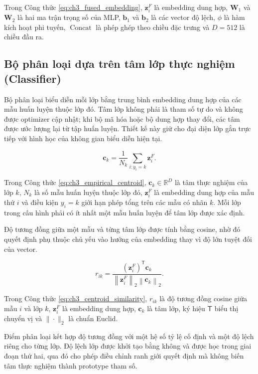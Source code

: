 Trong Công thức \ref{eq:ch3_fused_embedding}, $\boldsymbol{z}_{i}^{F}$ là embedding dung hợp, $\boldsymbol{W}_{1}$ và $\boldsymbol{W}_{2}$ là hai ma trận trọng số của MLP, $\boldsymbol{b}_{1}$ và $\boldsymbol{b}_{2}$ là các vector độ lệch, $\phi$ là hàm kích hoạt phi tuyến, $\operatorname{Concat}$ là phép ghép theo chiều đặc trưng và $D=512$ là chiều đầu ra.

\subsection{Bộ phân loại dựa trên tâm lớp thực nghiệm (Classifier)}

Bộ phân loại biểu diễn mỗi lớp bằng trung bình embedding dung hợp của các mẫu huấn luyện thuộc lớp đó. Tâm lớp không phải là tham số tự do và không được optimizer cập nhật; khi bộ mã hóa hoặc bộ dung hợp thay đổi, các tâm được ước lượng lại từ tập huấn luyện. Thiết kế này giữ cho đại diện lớp gắn trực tiếp với hình học của không gian biểu diễn hiện tại.

\begin{equation}\boldsymbol{c}_{k}=\frac{1}{N_{k}}\sum_{i:y_i=k}\boldsymbol{z}_{i}^{F}.\label{eq:ch3_empirical_centroid}\end{equation}

Trong Công thức \ref{eq:ch3_empirical_centroid}, $\boldsymbol{c}_{k}\in\mathbb{R}^{D}$ là tâm thực nghiệm của lớp $k$, $N_k$ là số mẫu huấn luyện thuộc lớp đó, $\boldsymbol{z}_{i}^{F}$ là embedding dung hợp của mẫu thứ $i$ và điều kiện $y_i=k$ giới hạn phép tổng trên các mẫu có nhãn $k$. Mỗi lớp trong cấu hình phải có ít nhất một mẫu huấn luyện để tâm lớp được xác định.

Độ tương đồng giữa một mẫu và từng tâm lớp được tính bằng cosine, nhờ đó quyết định phụ thuộc chủ yếu vào hướng của embedding thay vì độ lớn tuyệt đối của vector.

\begin{equation}r_{ik}=\frac{\left(\boldsymbol{z}_{i}^{F}\right)^{\mathsf{T}}\boldsymbol{c}_{k}}{\left\|\boldsymbol{z}_{i}^{F}\right\|_{2}\left\|\boldsymbol{c}_{k}\right\|_{2}}.\label{eq:ch3_centroid_similarity}\end{equation}

Trong Công thức \ref{eq:ch3_centroid_similarity}, $r_{ik}$ là độ tương đồng cosine giữa mẫu $i$ và lớp $k$, $\boldsymbol{z}_{i}^{F}$ là embedding dung hợp, $\boldsymbol{c}_{k}$ là tâm lớp, ký hiệu $\mathsf{T}$ biểu thị chuyển vị và $\|\cdot\|_2$ là chuẩn Euclid.

Điểm phân loại kết hợp độ tương đồng với một hệ số tỷ lệ cố định và một độ lệch riêng cho từng lớp. Độ lệch lớp được khởi tạo bằng không và được học trong giai đoạn thứ hai, qua đó cho phép điều chỉnh ranh giới quyết định mà không biến tâm thực nghiệm thành prototype tham số.

